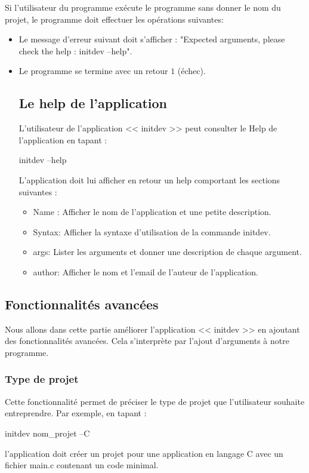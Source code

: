 \documentclass[10pt,a4paper]{article}
\begin{document}
  Si l'utilisateur du programme exécute le programme sans donner le nom du projet, le programme doit effectuer les opérations suivantes:
  \begin{itemize}
    \item  Le message d'erreur suivant doit s'afficher : "Expected arguments, please check the help : initdev --help".
    \item Le programme se termine avec un retour $1$ (échec).
    
    
    \subsection{Le help de l'application}
    L'utilisateur de l'application << initdev >> peut consulter le Help de l'application en tapant :
    \begin{center}
      initdev --help
    \end{center}
    L'application doit lui afficher en retour un help comportant les sections suivantes :
    \begin{itemize}
      \item Name : Afficher le nom de l'application et une petite description.
      \item Syntax: Afficher la syntaxe d'utilisation de la commande initdev.
      \item args: Lister les arguments et donner une description de chaque argument.
      \item author: Afficher le nom et l'email de l'auteur de l'application. 
    \end{itemize}

\end{itemize}



\subsection{Fonctionnalités avancées}
Nous allons dans cette partie améliorer l'application << initdev >> en ajoutant des fonctionnalités avancées. Cela s'interprète par l'ajout d'arguments à notre programme.


\subsubsection{Type de projet}
  Cette fonctionnalité permet de préciser le type de projet que l'utilisateur souhaite entreprendre. Par exemple, en tapant :
  \begin{center}
    initdev nom\_projet --C
  \end{center}
  l'application doit créer un projet pour une application en langage C avec un fichier main.c contenant un code minimal.
\end{document}
